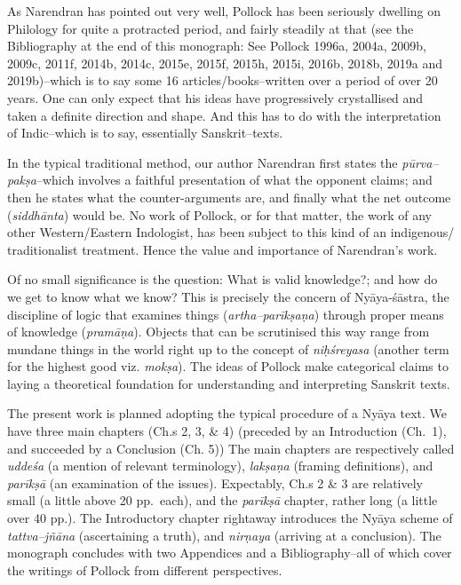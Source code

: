 As Narendran has pointed out very well, Pollock has been seriously dwelling on Philology for quite a protracted period, and fairly steadily at that (see the Bibliography at the end of this monograph: See Pollock 1996a, 2004a, 2009b, 2009c, 2011f, 2014b, 2014c, 2015e, 2015f, 2015h, 2015i, 2016b, 2018b, 2019a and 2019b)–which is to say some 16 articles/books–written over a period of over 20 years. One can only expect that his ideas have progressively crystallised and taken a definite direction and shape. And this has to do with the interpretation of Indic–which is to say, essentially Sanskrit–texts.

In the typical traditional method, our author Narendran first states the \textit{pūrva–pakṣa}–which involves a faithful presentation of what the opponent claims; and then he states what the counter-arguments are, and finally what the net outcome (\textit{siddhānta}) would be. No work of Pollock, or for that matter, the work of any other Western/Eastern Indologist, has been subject to this kind of an indigenous/ traditionalist treatment. Hence the value and importance of Narendran’s work.

Of no small significance is the question: What is valid knowledge?; and how do we get to know what we know? This is precisely the concern of Nyāya-śāstra, the discipline of logic that examines things (\textit{artha–parīkṣaṇa}) through proper means of knowledge (\textit{pramāṇa}). Objects that can be scrutinised this way range from mundane things in the world right up to the concept of \textit{niḥśreyasa} (another term for the highest good viz. \textit{mokṣa}). The ideas of Pollock make categorical claims to laying a theoretical foundation for understanding and interpreting Sanskrit texts.

The present work is planned adopting the typical procedure of a Nyāya text. We have three main chapters (Ch.s 2, 3, \& 4) (preceded by an Introduction (Ch.~1), and succeeded by a Conclusion (Ch. 5)) The main chapters are respectively called \textit{uddeśa} (a mention of relevant terminology), \textit{lakṣaṇa} (framing definitions), and \textit{parīkṣā} (an examination of the issues). Expectably, Ch.s 2 \& 3 are relatively small (a little above 20 pp.~each), and the \textit{parīkṣā} chapter, rather long (a little over 40 pp.). The Introductory chapter rightaway introduces the Nyāya scheme of \textit{tattva–jñāna} (ascertaining a truth), and \textit{nirṇaya} (arriving at a conclusion). The monograph concludes with two Appendices and a Bibliography–all of which cover the writings of Pollock from different perspectives.

